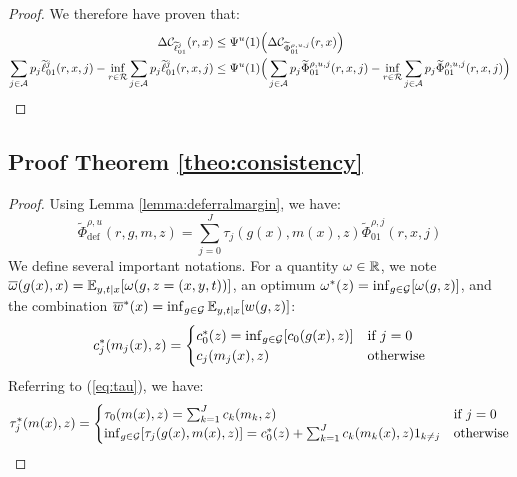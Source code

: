 \begin{appendices}
\begin{proof}
We therefore have proven that:
\begin{equation}
\begin{aligned}
  \Delta \mathcal{C}_{\widetilde{\ell}_{01}^j}(r,x) & \leq   \Psi^u(1) \Big(\Delta\mathcal{C}_{\widetilde{\Phi}_{01}^{\rho,u,j}}(r,x)\Big) \\
  \sum_{j\in\mathcal{A}} p_j \widetilde{\ell}_{01}^j(r,x,j) - \inf_{r\in\mathcal{R}} \sum_{j\in\mathcal{A}} p_j \widetilde{\ell}_{01}^j(r,x,j) &  \leq  \Psi^u(1)\Big( \sum_{j\in\mathcal{A}} p_j  \widetilde{\Phi}^{\rho,u,j}_{01}(r,x,j) - \inf_{r\in\mathcal{R}} \sum_{j\in\mathcal{A}} p_j  \widetilde{\Phi}^{\rho,u,j}_{01}(r,x,j)\Big)
\end{aligned}
\end{equation}
\end{proof}


\subsection{Proof Theorem \ref{theo:consistency}}
\consistency* \label{proof:consistency}
\begin{proof}
Using Lemma \ref{lemma:deferralmargin}, we have:
\begin{equation}
\widetilde{\Phi}^{\rho, u}_{\text{def}}(r, g,m,z) = \sum_{j=0}^J \tau_j(g(x),m(x),z)  \widetilde{\Phi}^{\rho, j}_{01}(r,x, j) 
\end{equation}
We define several important notations. For a quantity $\omega \in \mathbb{R}$, we note $\overline{\omega}(g(x),x) = \mathbb{E}_{y,t|x}[\omega(g,z=(x,y,t))]$, an optimum $\omega^\ast(z)=\inf_{g\in\mathcal{G}}[\omega(g,z)]$, and the combination $\overline{w}^\ast(x) = \inf_{g\in\mathcal{G}}\mathbb{E}_{y,t|x}[w(g,z)]$:
\begin{equation}
   c_j^\ast(m_j(x),z) =  \begin{cases}
      c_0^\ast(z) = \inf_{g\in\mathcal{G}}[c_0(g(x),z)] & \text{if } j=0\\
      c_j(m_j(x),z) & \text{otherwise}
    \end{cases}
\end{equation}
Referring to (\ref{eq:tau}), we have:
\begin{equation}
   \tau_j^\ast(m(x),z) =  \begin{cases}
      \tau_0(m(x),z) = \sum_{k=1}^Jc_k(m_k,z) & \text{if } j=0\\
      \inf_{g\in\mathcal{G}}[\tau_j(g(x),m(x),z)] = c_0^\ast(z) + \sum_{k=1}^J c_k(m_k(x),z)1_{k\not=j} & \text{otherwise}
    \end{cases}
\end{equation}


\end{proof}
\end{appendices}
